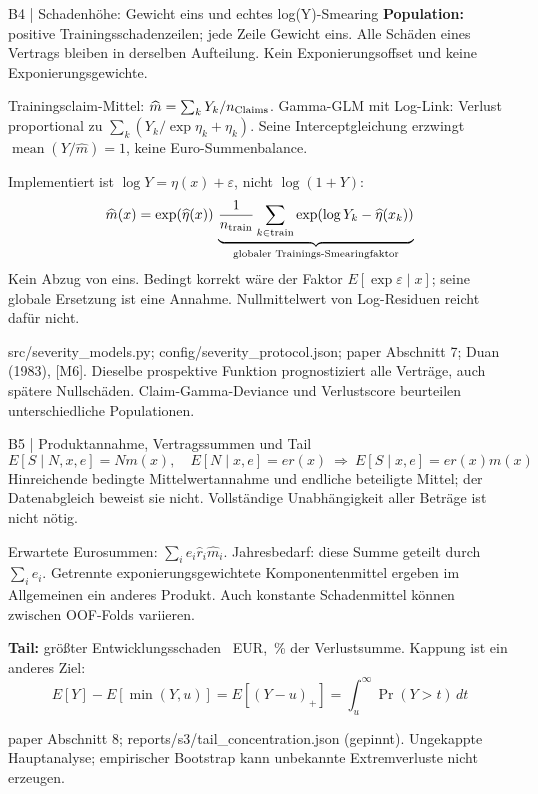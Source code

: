 \documentclass[aspectratio=169,11pt]{beamer}
\newcommand{\source}[1]{\vfill{\fontsize{6.5}{7.4}\selectfont\color{muted}#1\par}}
\newcommand{\smalltext}{\fontsize{9}{11.3}\selectfont}
\begin{document}
\begin{frame}[t]{B4 | Schadenhöhe: Gewicht eins und echtes log(Y)-Smearing}
\textbf{Population:} positive Trainingsschadenzeilen; jede Zeile Gewicht eins.
Alle Schäden eines Vertrags bleiben in derselben Aufteilung.
Kein Exponierungsoffset und keine Exponierungsgewichte.
\medskip

\smalltext Trainingsclaim-Mittel: $\widehat m=\sum_kY_k/n_{\rm Claims}$.
Gamma-GLM mit Log-Link: Verlust proportional zu $\sum_k(Y_k/\exp\eta_k+\eta_k)$.
Seine Interceptgleichung erzwingt $\operatorname{mean}(Y/\widehat m)=1$, keine Euro-Summenbalance.\par\medskip
Implementiert ist $\log Y=\eta(x)+\varepsilon$, nicht $\log(1+Y)$:
\[
\widehat m(x)=\exp(\widehat\eta(x))\,
\underbrace{\frac1{n_{\rm train}}\sum_{k\in\rm train}
 \exp(\log Y_k-\widehat\eta(x_k))}_{\text{globaler Trainings-Smearingfaktor}}
\]
Kein Abzug von eins. Bedingt korrekt wäre der Faktor
$E[\exp\varepsilon\mid x]$; seine globale Ersetzung ist eine Annahme.
Nullmittelwert von Log-Residuen reicht dafür nicht.
\source{src/severity\_models.py; config/severity\_protocol.json; paper Abschnitt 7; Duan (1983), [M6].
Dieselbe prospektive Funktion prognostiziert alle Verträge, auch spätere Nullschäden.
Claim-Gamma-Deviance und Verlustscore beurteilen unterschiedliche Populationen.}
\end{frame}

\begin{frame}[t]{B5 | Produktannahme, Vertragssummen und Tail}
\[
E[S\mid N,x,e]=N m(x),\quad E[N\mid x,e]=e r(x)
\ \Longrightarrow\ E[S\mid x,e]=e r(x)m(x)
\]
\smalltext Hinreichende bedingte Mittelwertannahme und endliche beteiligte Mittel;
der Datenabgleich beweist sie nicht. Vollständige Unabhängigkeit aller Beträge ist nicht nötig.\par\medskip
Erwartete Eurosummen: $\sum_i e_i\widehat r_i\widehat m_i$.
Jahresbedarf: diese Summe geteilt durch $\sum_i e_i$.
Getrennte exponierungsgewichtete Komponentenmittel ergeben im Allgemeinen ein anderes Produkt.
Auch konstante Schadenmittel können zwischen OOF-Folds variieren.\par\medskip
\textbf{Tail:} größter Entwicklungsschaden \LargestClaim\ EUR,
\LargestShare\,\% der Verlustsumme.
Kappung ist ein anderes Ziel:
\[
E[Y]-E[\min(Y,u)]=E[(Y-u)_+]=\int_u^\infty\Pr(Y>t)\,dt
\]
\source{paper Abschnitt 8; reports/s3/tail\_concentration.json (gepinnt).
Ungekappte Hauptanalyse; empirischer Bootstrap kann unbekannte Extremverluste nicht erzeugen.}
\end{frame}
\end{document}
